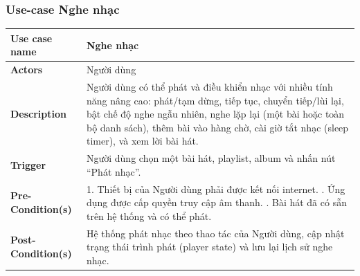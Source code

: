 \documentclass[a4paper]{article}
\begin{document}
\subsubsection{Use-case Nghe nhạc}
\begin{table}[H]
	\centering
	\renewcommand{\arraystretch}{1.3} %
	\begin{tabularx}{\textwidth}{|l|X|}
		\hline
		\textbf{Use case name} & Nghe nhạc                                                                                                                                                                                                                                                                   \\ \hline
		\textbf{Actors}        & Người dùng                                                                                                                                                                                                                                                                  \\ \hline
		\textbf{Description}   & Người dùng có thể phát và điều khiển nhạc với nhiều tính năng nâng cao: phát/tạm dừng, tiếp tục, chuyển tiếp/lùi lại, bật chế độ nghe ngẫu nhiên, nghe lặp lại (một bài hoặc toàn bộ danh sách), thêm bài vào hàng chờ, cài giờ tắt nhạc (sleep timer), và xem lời bài hát. \\ \hline
		\textbf{Trigger}       & Người dùng chọn một bài hát, playlist, album và nhấn nút “Phát nhạc”.                                                                                                                                                                                                       \\ \hline
		\textbf{Pre-Condition(s)}
		                       & 1. Thiết bị của Người dùng phải được kết nối internet. \newline
		2. Ứng dụng được cấp quyền truy cập âm thanh. \newline
		3. Bài hát đã có sẵn trên hệ thống và có thể phát.                                                                                                                                                                                                                                                   \\ \hline
		\textbf{Post-Condition(s)}
		                       & Hệ thống phát nhạc theo thao tác của Người dùng, cập nhật trạng thái trình phát (player state) và lưu lại lịch sử nghe nhạc.                                                                                                                                                \\ \hline

\end{tabularx}
\end{table}
\end{document}
